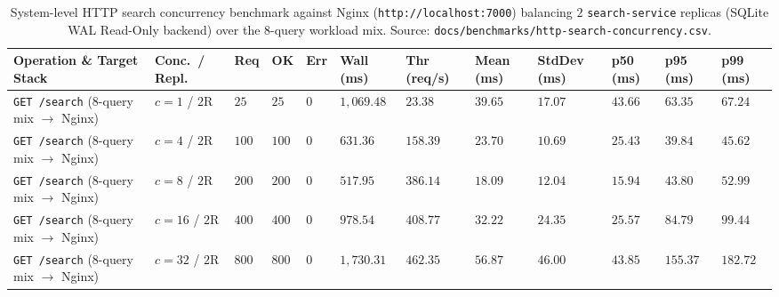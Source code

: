 \documentclass[10pt,a4paper]{article}
\begin{document}
\begin{table}[!htbp]
\centering
\caption{System-level HTTP search concurrency benchmark against Nginx (\texttt{http://localhost:7000}) balancing $2$ \texttt{search-service} replicas (SQLite WAL Read-Only backend) over the 8-query workload mix. Source: \texttt{docs/benchmarks/http-search-concurrency.csv}.}
\label{tab:http_concurrency}
\scriptsize
\setlength{\tabcolsep}{3.5pt}
\renewcommand{\arraystretch}{1.18}
\begin{tabularx}{\textwidth}{Y C{1.5cm} R{0.8cm} R{0.8cm} R{0.6cm} R{1.4cm} R{1.5cm} R{1.2cm} R{1.3cm} R{1.2cm} R{1.2cm} R{1.2cm}}
\toprule
\textbf{Operation \& Target Stack} & \textbf{Conc.\ / Repl.} & \textbf{Req} & \textbf{OK} & \textbf{Err} & \textbf{Wall (ms)} & \textbf{Thr (req/s)} & \textbf{Mean (ms)} & \textbf{StdDev (ms)} & \textbf{p50 (ms)} & \textbf{p95 (ms)} & \textbf{p99 (ms)} \\
\midrule
\texttt{GET /search} (8-query mix $\to$ Nginx) & $c=1$ / $2\text{R}$ & $25$ & $25$ & $0$ & $1,069.48$ & $23.38$ & $39.65$ & $17.07$ & $43.66$ & $63.35$ & $67.24$ \\
\texttt{GET /search} (8-query mix $\to$ Nginx) & $c=4$ / $2\text{R}$ & $100$ & $100$ & $0$ & $631.36$ & $158.39$ & $23.70$ & $10.69$ & $25.43$ & $39.84$ & $45.62$ \\
\texttt{GET /search} (8-query mix $\to$ Nginx) & $c=8$ / $2\text{R}$ & $200$ & $200$ & $0$ & $517.95$ & $386.14$ & $18.09$ & $12.04$ & $15.94$ & $43.80$ & $52.99$ \\
\texttt{GET /search} (8-query mix $\to$ Nginx) & $c=16$ / $2\text{R}$ & $400$ & $400$ & $0$ & $978.54$ & $408.77$ & $32.22$ & $24.35$ & $25.57$ & $84.79$ & $99.44$ \\
\texttt{GET /search} (8-query mix $\to$ Nginx) & $c=32$ / $2\text{R}$ & $800$ & $800$ & $0$ & $1,730.31$ & $462.35$ & $56.87$ & $46.00$ & $43.85$ & $155.37$ & $182.72$ \\
\bottomrule
\end{tabularx}
\end{table}
\end{document}
